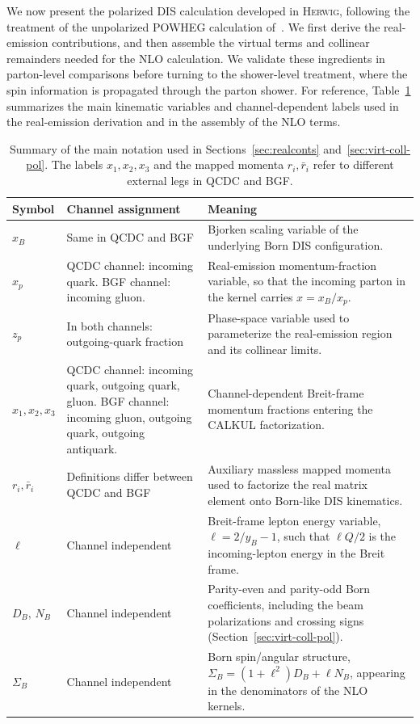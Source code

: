 \documentclass[a4paper,11pt]{article}
\newcommand{\Herwig}{\textsc{Herwig}}
\begin{document}
We now present the polarized DIS calculation developed in \Herwig, following the treatment of the unpolarized POWHEG calculation of~\cite{DErrico:2011wfa}. We first
derive the real-emission contributions, and then assemble the virtual terms and
collinear remainders needed for the NLO calculation. We validate these
ingredients in parton-level comparisons before turning to the shower-level
treatment, where the spin information is propagated through the parton shower. For reference, Table~\ref{tab:dis-notation-summary} summarizes the main kinematic variables and channel-dependent labels used in the real-emission derivation and in the assembly of the NLO terms.

\begin{table}[t]
  \centering
  \footnotesize
  \setlength{\tabcolsep}{4pt}
  \begin{tabular}{|p{}|p{}|p{}|}
    \hline
    Symbol & Channel assignment & Meaning \\
    \hline
    $x_B$ & Same in QCDC and BGF & Bjorken scaling variable of the underlying Born DIS configuration. \\
    \hline
    $x_p$ & QCDC channel: incoming quark. BGF channel: incoming gluon. & Real-emission momentum-fraction variable, so that the incoming parton in the kernel carries $x=x_B/x_p$. \\
    \hline
    $z_p$ & In both channels: outgoing-quark fraction & Phase-space variable used to parameterize the real-emission region and its collinear limits. \\
    \hline
    $x_1,x_2,x_3$ & QCDC channel: incoming quark, outgoing quark, gluon. BGF channel: incoming gluon, outgoing quark, outgoing antiquark. & Channel-dependent Breit-frame momentum fractions entering the CALKUL factorization. \\
    \hline
    $r_i,\bar r_i$ & Definitions differ between QCDC and BGF & Auxiliary massless mapped momenta used to factorize the real matrix element onto Born-like DIS kinematics. \\
    \hline
    $\ell$ & Channel independent & Breit-frame lepton energy variable, $\ell=2/y_B-1$, such that $\ell Q/2$ is the incoming-lepton energy in the Breit frame. \\
    \hline
    $D_B,\,N_B$ & Channel independent & Parity-even and parity-odd Born coefficients, including the beam polarizations and crossing signs (Section~\ref{sec:virt-coll-pol}). \\
    \hline
    $\Sigma_B$ & Channel independent & Born spin/angular structure, $\Sigma_B=(1+\ell^2)D_B+\ell N_B$, appearing in the denominators of the NLO kernels. \\
    \hline
  \end{tabular}
  \caption{Summary of the main notation used in Sections~\ref{sec:realconts} and~\ref{sec:virt-coll-pol}. The labels $x_1,x_2,x_3$ and the mapped momenta $r_i,\bar r_i$ refer to different external legs in QCDC and BGF.}
  \label{tab:dis-notation-summary}
\end{table}
\end{document}
